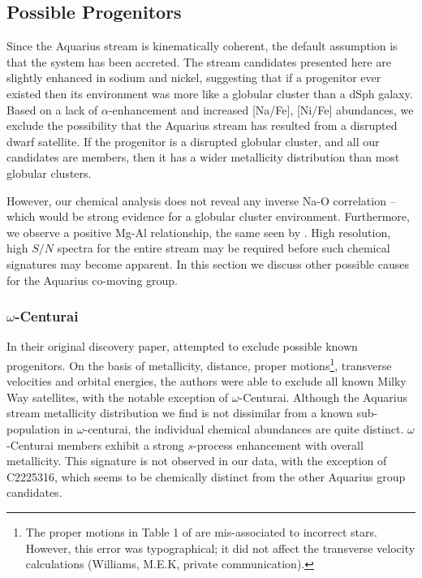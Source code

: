 \documentclass{emulateapj}
\begin{document}
\subsection{Possible Progenitors}

Since the Aquarius stream is kinematically coherent, the default assumption is that the system has been accreted. The stream candidates presented here are slightly enhanced in sodium and nickel, suggesting that if a progenitor ever existed then its environment was more like a globular cluster than a dSph galaxy. Based on a lack of $\alpha$-enhancement and increased [Na/Fe], [Ni/Fe] abundances, we exclude the possibility that the Aquarius stream has resulted from a disrupted dwarf satellite. If the progenitor is a disrupted globular cluster, and all our candidates are members, then it has a wider metallicity distribution than most globular clusters. 

However, our chemical analysis does not reveal any inverse Na-O correlation \--- which would be strong evidence for a globular cluster environment. Furthermore, we observe a positive Mg-Al relationship, the same seen by \citet{wylie-de-boer;et-al_2012}. High resolution, high $S/N$ spectra for the entire stream may be required before such chemical signatures may become apparent. In this section we discuss other possible causes for the Aquarius co-moving group.

\subsubsection{$\omega$-Centurai}

In their original discovery paper, \citet{williams;et-al_2011} attempted to exclude possible known progenitors. On the basis of metallicity, distance, proper motions\footnote{The proper motions in Table 1 of \citet{williams;et-al_2011} are mis-associated to incorrect stars. However, this error was typographical; it did not affect the transverse velocity calculations (Williams, M.E.K, private communication).}, transverse velocities and orbital energies, the authors were able to exclude all known Milky Way satellites, with the notable exception of $\omega$-Centurai. Although the Aquarius stream metallicity distribution we find is not dissimilar from a known sub-population in $\omega$-centurai, the individual chemical abundances are quite distinct. $\omega$-Centurai members exhibit a strong $s$-process enhancement with overall metallicity. This signature is not observed in our data, with the exception of C2225316, which seems to be chemically distinct from the other Aquarius group candidates.
\end{document}
